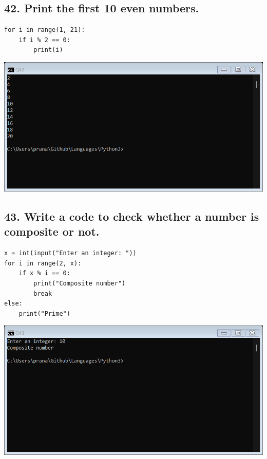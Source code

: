 \documentclass[12pt]{article}
\begin{document}
\subsection*{42. Print the first 10 even numbers.}
\begin{verbatim}
for i in range(1, 21):
    if i % 2 == 0:
        print(i)
\end{verbatim}
\includegraphics[width=\linewidth]{images/42.png}

\subsection*{43. Write a code to check whether a number is composite or not.}
\begin{verbatim}
x = int(input("Enter an integer: "))
for i in range(2, x):
    if x % i == 0:
        print("Composite number")
        break
else:
    print("Prime")
\end{verbatim}
\includegraphics[width=\linewidth]{images/43.png}
\end{document}
